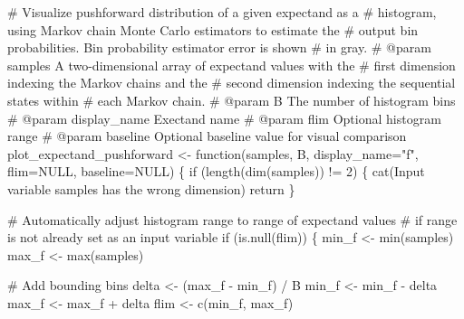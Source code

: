 \documentclass[
  letterpaper,
  DIV=11,
  numbers=noendperiod]{scrartcl}
\newenvironment{Shaded}{\begin{snugshade}}{\end{snugshade}}
\newcommand{\AttributeTok}[1]{\textcolor[rgb]{0.40,0.45,0.13}{#1}}
\newcommand{\CommentTok}[1]{\textcolor[rgb]{0.37,0.37,0.37}{#1}}
\newcommand{\ConstantTok}[1]{\textcolor[rgb]{0.56,0.35,0.01}{#1}}
\newcommand{\ControlFlowTok}[1]{\textcolor[rgb]{0.00,0.23,0.31}{#1}}
\newcommand{\DecValTok}[1]{\textcolor[rgb]{0.68,0.00,0.00}{#1}}
\newcommand{\FunctionTok}[1]{\textcolor[rgb]{0.28,0.35,0.67}{#1}}
\newcommand{\NormalTok}[1]{\textcolor[rgb]{0.00,0.23,0.31}{#1}}
\newcommand{\OtherTok}[1]{\textcolor[rgb]{0.00,0.23,0.31}{#1}}
\newcommand{\SpecialCharTok}[1]{\textcolor[rgb]{0.37,0.37,0.37}{#1}}
\newcommand{\StringTok}[1]{\textcolor[rgb]{0.13,0.47,0.30}{#1}}
\begin{document}
\begin{Shaded}
\begin{Highlighting}[]
\CommentTok{\# Visualize pushforward distribution of a given expectand as a }
\CommentTok{\# histogram, using Markov chain Monte Carlo estimators to estimate the }
\CommentTok{\# output bin probabilities.  Bin probability estimator error is shown }
\CommentTok{\# in gray.}
\CommentTok{\# @param samples A two{-}dimensional array of expectand values with the }
\CommentTok{\#                first dimension indexing the Markov chains and the }
\CommentTok{\#                second dimension indexing the sequential states within }
\CommentTok{\#                each Markov chain.}
\CommentTok{\# @param B The number of histogram bins}
\CommentTok{\# @param display\_name Exectand name}
\CommentTok{\# @param flim Optional histogram range}
\CommentTok{\# @param baseline Optional baseline value for visual comparison}
\NormalTok{plot\_expectand\_pushforward }\OtherTok{\textless{}{-}} \ControlFlowTok{function}\NormalTok{(samples, B, }\AttributeTok{display\_name=}\StringTok{"f"}\NormalTok{, }
                                       \AttributeTok{flim=}\ConstantTok{NULL}\NormalTok{, }\AttributeTok{baseline=}\ConstantTok{NULL}\NormalTok{) \{}
  \ControlFlowTok{if}\NormalTok{ (}\FunctionTok{length}\NormalTok{(}\FunctionTok{dim}\NormalTok{(samples)) }\SpecialCharTok{!=} \DecValTok{2}\NormalTok{) \{}
    \FunctionTok{cat}\NormalTok{(}\StringTok{\textquotesingle{}Input variable \textasciigrave{}samples\textasciigrave{} has the wrong dimension\textquotesingle{}}\NormalTok{)}
\NormalTok{    return}
\NormalTok{  \}}
  
  \CommentTok{\# Automatically adjust histogram range to range of expectand values}
  \CommentTok{\# if range is not already set as an input variable}
  \ControlFlowTok{if}\NormalTok{ (}\FunctionTok{is.null}\NormalTok{(flim)) \{}
\NormalTok{    min\_f }\OtherTok{\textless{}{-}} \FunctionTok{min}\NormalTok{(samples)}
\NormalTok{    max\_f }\OtherTok{\textless{}{-}} \FunctionTok{max}\NormalTok{(samples)}
    
    \CommentTok{\# Add bounding bins}
\NormalTok{    delta }\OtherTok{\textless{}{-}}\NormalTok{ (max\_f }\SpecialCharTok{{-}}\NormalTok{ min\_f) }\SpecialCharTok{/}\NormalTok{ B}
\NormalTok{    min\_f }\OtherTok{\textless{}{-}}\NormalTok{ min\_f }\SpecialCharTok{{-}}\NormalTok{ delta}
\NormalTok{    max\_f }\OtherTok{\textless{}{-}}\NormalTok{ max\_f }\SpecialCharTok{+}\NormalTok{ delta}
\NormalTok{    flim }\OtherTok{\textless{}{-}} \FunctionTok{c}\NormalTok{(min\_f, max\_f)}
    

\end{Highlighting}
\end{Shaded}
\end{document}
